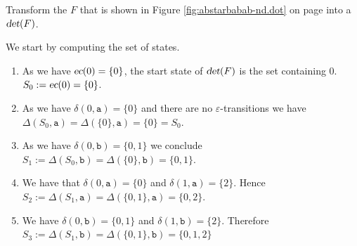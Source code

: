 \exerciseEng
Transform the  $F$ that is shown in Figure \ref{fig:abstarbabab-nd.dot} on page
\pageref{fig:abstarbabab-nd.dot}  into a  $\textsl{det}(F)$.  \eox

\solutionEng
We start by computing the set of states.
\begin{enumerate}
\item As we have $\textsl{ec}(0) = \{0\}$, the start state of $\textsl{det}(F)$  is the set containing $0$.
      \\[0.2cm]
      \hspace*{1.3cm}
      $S_0 := \textsl{ec}(0) = \{ 0 \}$.
\item As we have $\delta(0, \texttt{a}) = \{0\}$ and there are no $\varepsilon$-transitions we have
      \\[0.2cm]
      \hspace*{1.3cm}
      $\Delta(S_0, \texttt{a}) = \Delta(\{0\}, \texttt{a}) = \{0\} = S_0$.
\item As we have $\delta(0, \texttt{b}) = \{0, 1\}$ we conclude
      \\[0.2cm]
      \hspace*{1.3cm}
      $S_1 := \Delta(S_0, \texttt{b}) = \Delta(\{0\}, \texttt{b}) = \{ 0, 1 \}$.
\item We have that $\delta(0, \texttt{a}) = \{ 0 \}$ and $\delta(1, \texttt{a}) = \{ 2 \}$.
      Hence
      \\[0.2cm]
      \hspace*{1.3cm}
      $S_2 := \Delta(S_1, \texttt{a}) = \Delta(\{ 0, 1 \}, \texttt{a}) = \{ 0, 2 \}$.
\item We have $\delta(0, \texttt{b}) = \{ 0, 1 \}$ and $\delta(1, \texttt{b}) = \{ 2 \}$.
      Therefore
      \\[0.2cm]
      \hspace*{1.3cm}
      $S_3 := \Delta(S_1, \texttt{b}) = \Delta(\{ 0, 1 \}, \texttt{b}) = \{ 0, 1, 2 \}$


\end{enumerate}
